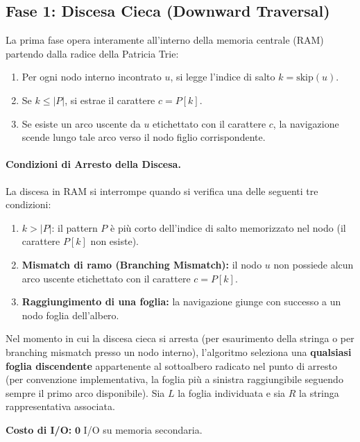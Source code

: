 \FloatBarrier
\subsection{Fase 1: Discesa Cieca (Downward Traversal)}
\label{subsec:fase-1-discesa-cieca}

La prima fase opera interamente all'interno della memoria centrale (RAM) partendo dalla radice della Patricia Trie:
\begin{enumerate}
  \item Per ogni nodo interno incontrato $u$, si legge l'indice di salto $k = \text{skip}(u)$.
  \item Se $k \le |P|$, si estrae il carattere $c = P[k]$.
  \item Se esiste un arco uscente da $u$ etichettato con il carattere $c$, la navigazione scende lungo tale arco verso il nodo figlio corrispondente.
\end{enumerate}

\paragraph{Condizioni di Arresto della Discesa.}
La discesa in RAM si interrompe quando si verifica una delle seguenti tre condizioni:
\begin{enumerate}
  \item $k > |P|$: il pattern $P$ \`e pi\`u corto dell'indice di salto memorizzato nel nodo (il carattere $P[k]$ non esiste).
  \item \textbf{Mismatch di ramo (Branching Mismatch):} il nodo $u$ non possiede alcun arco uscente etichettato con il carattere $c = P[k]$.
  \item \textbf{Raggiungimento di una foglia:} la navigazione giunge con successo a un nodo foglia dell'albero.
\end{enumerate}

\begin{definition}
Nel momento in cui la discesa cieca si arresta (per esaurimento della stringa o per branching mismatch presso un nodo interno), l'algoritmo seleziona una \textbf{qualsiasi foglia discendente} appartenente al sottoalbero radicato nel punto di arresto (per convenzione implementativa, la foglia pi\`u a sinistra raggiungibile seguendo sempre il primo arco disponibile). Sia $L$ la foglia individuata e sia $R$ la stringa rappresentativa associata.
\end{definition}

\textbf{Costo di I/O:} $\mathbf{0}$ I/O su memoria secondaria.

